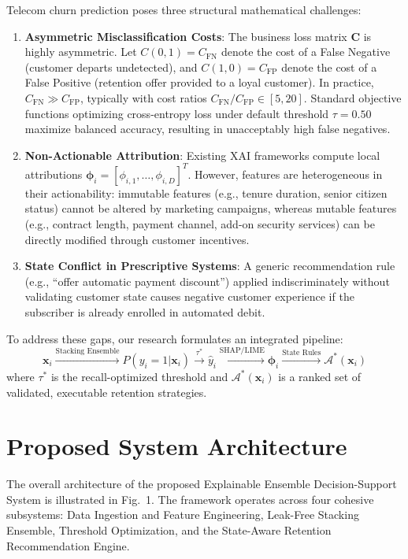 \documentclass[conference]{IEEEtran}
\begin{document}
Telecom churn prediction poses three structural mathematical challenges:
\begin{enumerate}
    \item \textbf{Asymmetric Misclassification Costs}: The business loss matrix $\mathbf{C}$ is highly asymmetric. Let $C(0, 1) = C_{\text{FN}}$ denote the cost of a False Negative (customer departs undetected), and $C(1, 0) = C_{\text{FP}}$ denote the cost of a False Positive (retention offer provided to a loyal customer). In practice, $C_{\text{FN}} \gg C_{\text{FP}}$, typically with cost ratios $C_{\text{FN}} / C_{\text{FP}} \in [5, 20]$. Standard objective functions optimizing cross-entropy loss under default threshold $\tau=0.50$ maximize balanced accuracy, resulting in unacceptably high false negatives.
    \item \textbf{Non-Actionable Attribution}: Existing XAI frameworks compute local attributions $\boldsymbol{\phi}_i = [\phi_{i,1}, \dots, \phi_{i,D}]^T$. However, features are heterogeneous in their actionability: immutable features (e.g., tenure duration, senior citizen status) cannot be altered by marketing campaigns, whereas mutable features (e.g., contract length, payment channel, add-on security services) can be directly modified through customer incentives.
    \item \textbf{State Conflict in Prescriptive Systems}: A generic recommendation rule (e.g., ``offer automatic payment discount'') applied indiscriminately without validating customer state causes negative customer experience if the subscriber is already enrolled in automated debit.
\end{enumerate}

To address these gaps, our research formulates an integrated pipeline:
\begin{equation}
    \mathbf{x}_i \xrightarrow{\text{Stacking Ensemble}} P(y_i=1|\mathbf{x}_i) \xrightarrow{\tau^*} \hat{y}_i \xrightarrow{\text{SHAP/LIME}} \boldsymbol{\phi}_i \xrightarrow{\text{State Rules}} \mathcal{A}^*(\mathbf{x}_i)
\end{equation}
where $\tau^*$ is the recall-optimized threshold and $\mathcal{A}^*(\mathbf{x}_i)$ is a ranked set of validated, executable retention strategies.

\section{Proposed System Architecture}
The overall architecture of the proposed Explainable Ensemble Decision-Support System is illustrated in Fig.~1. The framework operates across four cohesive subsystems: Data Ingestion and Feature Engineering, Leak-Free Stacking Ensemble, Threshold Optimization, and the State-Aware Retention Recommendation Engine.
\end{document}
